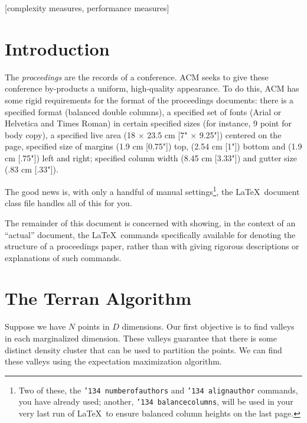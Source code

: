 \documentclass{acm_proc_article-sp}
\begin{document}
[complexity measures, performance measures]



\section{Introduction}
The \textit{proceedings} are the records of a conference.
ACM seeks to give these conference by-products a uniform,
high-quality appearance.  To do this, ACM has some rigid
requirements for the format of the proceedings documents: there
is a specified format (balanced  double columns), a specified
set of fonts (Arial or Helvetica and Times Roman) in
certain specified sizes (for instance, 9 point for body copy),
a specified live area (18 $\times$ 23.5 cm [7" $\times$ 9.25"]) centered on
the page, specified size of margins (1.9 cm [0.75"]) top, (2.54 cm [1"]) bottom
and (1.9 cm [.75"]) left and right; specified column width
(8.45 cm [3.33"]) and gutter size (.83 cm [.33"]).

The good news is, with only a handful of manual
settings\footnote{Two of these, the {\texttt{\char'134 numberofauthors}}
and {\texttt{\char'134 alignauthor}} commands, you have
already used; another, {\texttt{\char'134 balancecolumns}}, will
be used in your very last run of \LaTeX\ to ensure
balanced column heights on the last page.}, the \LaTeX\ document
class file handles all of this for you.

The remainder of this document is concerned with showing, in
the context of an ``actual'' document, the \LaTeX\ commands
specifically available for denoting the structure of a
proceedings paper, rather than with giving rigorous descriptions
or explanations of such commands.

\section{The Terran Algorithm}

Suppose we have $N$ points in $D$ dimensions. Our first objective is to find valleys in each marginalized dimension. These valleys guarantee that there is some distinct density cluster that can be used to partition the points. We can find these valleys using the expectation maximization algorithm.
\end{document}
